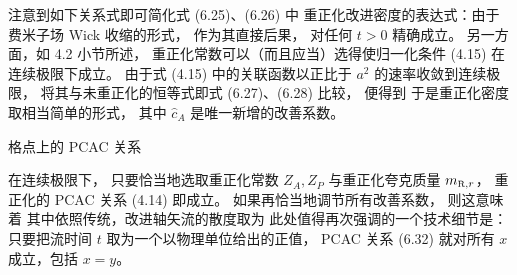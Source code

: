 注意到如下关系式即可简化式 (6.25)、(6.26) 中
重正化改进密度的表达式：由于费米子场 Wick 收缩的形式，
作为其直接后果，
对任何 $t>0$ 精确成立。
另一方面，如 4.2 小节所述，
重正化常数可以（而且应当）选得使归一化条件 (4.15)
在连续极限下成立。
由于式 (4.15) 中的关联函数以正比于 $a^2$ 的速率收敛到连续极限，
将其与未重正化的恒等式即式 (6.27)、(6.28) 比较，
便得到
于是重正化密度
取相当简单的形式，
其中 $\hat{c}_A$ 是唯一新增的改善系数。


 格点上的 PCAC 关系

在连续极限下，
只要恰当地选取重正化常数 $Z_A,Z_P$
与重正化夸克质量 $\mR{r}$，
重正化的 PCAC 关系 (4.14) 即成立。
如果再恰当地调节所有改善系数，
则这意味着
其中依照传统，改进轴矢流的散度取为
此处值得再次强调的一个技术细节是：
只要把流时间 $t$ 取为一个以物理单位给出的正值，
PCAC 关系 (6.32) 就对所有 $x$ 成立，包括 $x=y$。
